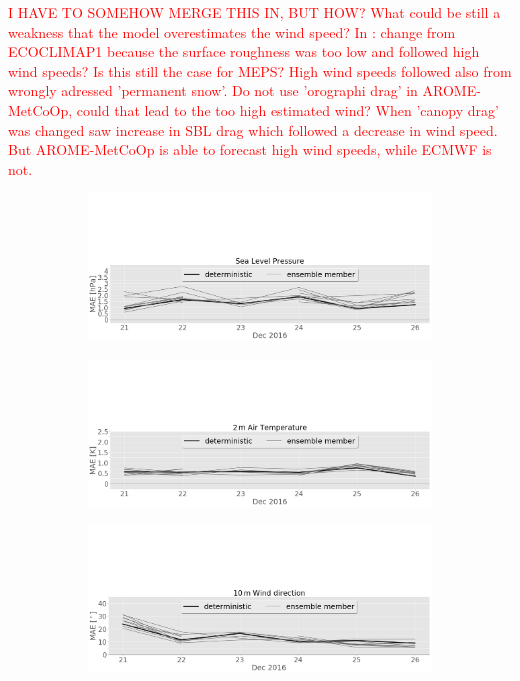 \textcolor{red}{I HAVE TO SOMEHOW MERGE THIS IN, BUT HOW? What could be still a weakness that the model overestimates the wind speed? In \citet{muller_arome-metcoop:_2017}: change from ECOCLIMAP1 because the surface roughness was too low and followed high wind speeds? Is this still the case for MEPS? High wind speeds followed also from wrongly adressed 'permanent snow'. Do not use 'orographi drag' in AROME-MetCoOp, could that lead to the too high estimated wind? When 'canopy drag' was changed saw increase in SBL drag which followed a decrease in wind speed. But AROME-MetCoOp is able to forecast high wind speeds, while ECMWF is not.}
\begin{figure}[H]%
	\centering
	\begin{subfigure}[b]{\textwidth}
		\includegraphics[trim={0cm 0cm 0cm 9.5cm},clip,width=\textwidth]{./fig_sfc_pressure/MAE_20161220_26_00}
		\caption{}\label{fig:MAE:pres}
	\end{subfigure}
	\begin{subfigure}[b]{\textwidth}
		\includegraphics[trim={0cm 0cm 0cm 9.5cm},clip,width=\textwidth]{./fig_sfc_temp/MAE_20161220_26_00}
		\caption{}\label{fig:MAE:temp}
	\end{subfigure}
	\begin{subfigure}[b]{\textwidth}
		\includegraphics[trim={0cm 0cm 0cm 9.5cm},clip,width=\textwidth]{./fig_sfc_wd/MAE_20161220_26_00}

\end{subfigure}
\end{figure}
